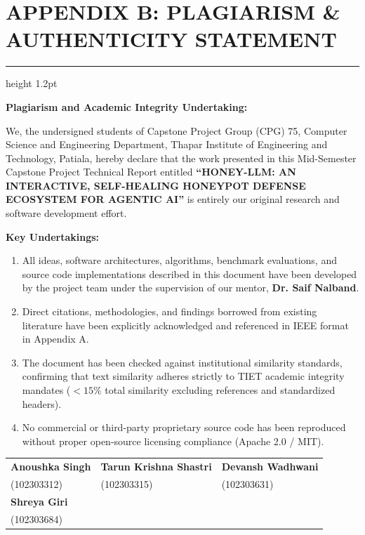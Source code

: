 \documentclass[12pt,a4paper,oneside]{report}
\begin{document}
\endgroup

\newpage

\chapter*{APPENDIX B: PLAGIARISM \& AUTHENTICITY STATEMENT}
\hrule height 1.2pt
\vspace{0.15in}

\noindent\textbf{Plagiarism and Academic Integrity Undertaking:}

We, the undersigned students of Capstone Project Group (CPG) 75, Computer Science and Engineering Department, Thapar Institute of Engineering and Technology, Patiala, hereby declare that the work presented in this Mid-Semester Capstone Project Technical Report entitled \textbf{``HONEY-LLM: AN INTERACTIVE, SELF-HEALING HONEYPOT DEFENSE ECOSYSTEM FOR AGENTIC AI''} is entirely our original research and software development effort.

\vspace{0.1in}
\noindent\textbf{Key Undertakings:}
\begin{enumerate}
    \item All ideas, software architectures, algorithms, benchmark evaluations, and source code implementations described in this document have been developed by the project team under the supervision of our mentor, \textbf{Dr. Saif Nalband}.
    \item Direct citations, methodologies, and findings borrowed from existing literature have been explicitly acknowledged and referenced in IEEE format in Appendix A.
    \item The document has been checked against institutional similarity standards, confirming that text similarity adheres strictly to TIET academic integrity mandates ($<15\%$ total similarity excluding references and standardized headers).
    \item No commercial or third-party proprietary source code has been reproduced without proper open-source licensing compliance (Apache 2.0 / MIT).
\end{enumerate}

\vspace{0.35in}
\noindent
\begin{tabularx}{\textwidth}{@{}X X X@{}}
\textbf{Anoushka Singh} & \textbf{Tarun Krishna Shastri} & \textbf{Devansh Wadhwani} \\
(102303312) & (102303315) & (102303631) \\[0.4in]
\textbf{Shreya Giri} & & \\
(102303684) & & \\
\end{tabularx}
\end{document}
